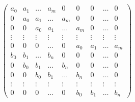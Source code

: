 \documentclass{amsart}
\begin{document}
\[
\begin{pmatrix}
a_0 & a_1 & \dots & a_m & 0 & 0 & 0 & \dots & 0 \\
0 & a_0 & a_1 & \dots & a_m & 0 & 0 & \dots & 0 \\
0 & 0 & a_0 & a_1 & \dots & a_m & 0 & \dots & 0 \\
\vdots & \vdots & 
\vdots & 
\vdots & 
\vdots & 
\vdots & 
\vdots & 
\vdots & 
\vdots \\
0 & 0 & 0 & \dots & 0 & a_0 & a_1 & \dots & a_m \\
b_0 & b_1 & \dots & b_n & 0 & 0 & 0 & \dots & 0 \\
0 & b_0 & b_1 & \dots & b_n & 0 & 0 & \dots & 0 \\
0 & 0 & b_0 & b_1 & \dots & b_n & 0 & \dots & 0 \\
\vdots & \vdots & 
\vdots & 
\vdots & 
\vdots & 
\vdots & 
\vdots & 
\vdots & 
\vdots \\
0 & 0 & 0 & \dots & 0 & b_0 & b_1 & \dots & b_n 
\end{pmatrix}
\]
\end{document}
